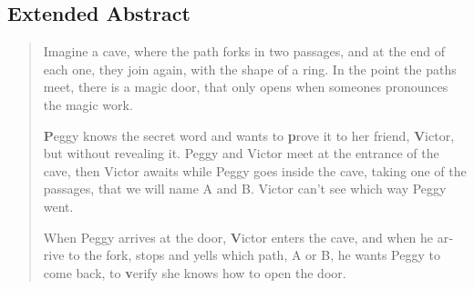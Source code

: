 
\begingroup
\let\clearpage\relax
\let\cleardoublepage\relax
\let\cleardoublepage\relax

\begin{otherlanguage}{english}
\chapter*{Extended Abstract}





\hfil

\begin{quote}
	Imagine a cave, where the path forks in two passages, and at the end of each one, they join again, with the shape of a ring. In the point the paths meet, there is a magic door, that only opens when someones pronounces the magic work.
	
	\textbf{P}eggy knows the secret word and wants to \textbf{p}rove it to her friend, \textbf{V}ictor, but without revealing it.
	Peggy and Victor meet at the entrance of the cave, then Victor awaits while Peggy goes inside the cave, taking one of the passages, that we will name A and B. Victor can't see which way Peggy went. 
	
	When Peggy arrives at the door, \textbf{V}ictor enters the cave, and when he arrive to the fork, stops and yells which path, A or B, he wants Peggy to come back, to \textbf{v}erify she knows how to open the door.
	

\end{quote}
\end{otherlanguage}
